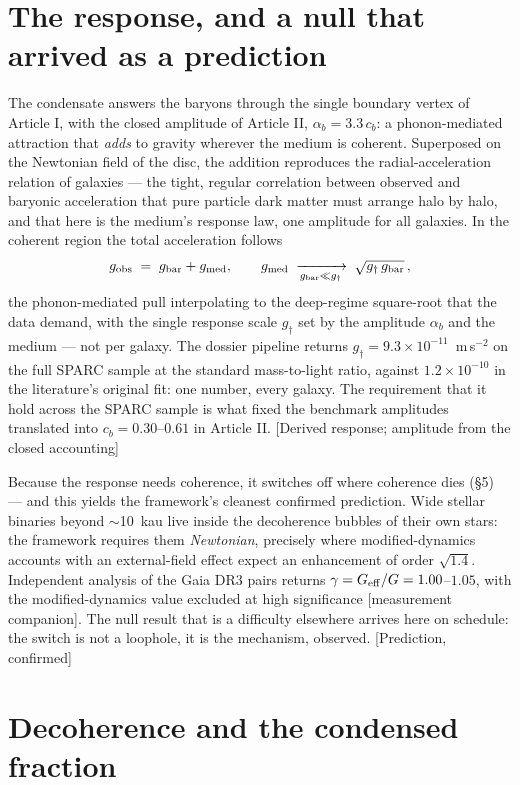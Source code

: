 \section{The response, and a null that arrived as a prediction}
The condensate answers the baryons through the single boundary vertex of Article I, with the closed amplitude of Article II, $\alpha_{b}=3.3\,c_{b}$: a phonon-mediated attraction that \emph{adds} to gravity wherever the medium is coherent. Superposed on the Newtonian field of the disc, the addition reproduces the radial-acceleration relation of galaxies --- the tight, regular correlation between observed and baryonic acceleration that pure particle dark matter must arrange halo by halo, and that here is the medium's response law, one amplitude for all galaxies. In the coherent region the total acceleration follows
\begin{equation}
g_{\rm obs}\;=\;g_{\rm bar}+g_{\rm med},\qquad g_{\rm med}\;\xrightarrow[g_{\rm bar}\ll g_{\dagger}]{}\;\sqrt{g_{\dagger}\,g_{\rm bar}}\,,
\end{equation}
the phonon-mediated pull interpolating to the deep-regime square-root that the data demand, with the single response scale $g_{\dagger}$ set by the amplitude $\alpha_{b}$ and the medium --- not per galaxy. The dossier pipeline returns $g_{\dagger}=9.3\times10^{-11}$~m\,s$^{-2}$ on the full SPARC sample at the standard mass-to-light ratio, against $1.2\times10^{-10}$ in the literature's original fit: one number, every galaxy. The requirement that it hold across the SPARC sample is what fixed the benchmark amplitudes translated into $c_{b}=0.30$--$0.61$ in Article II. [Derived response; amplitude from the closed accounting]

Because the response needs coherence, it switches off where coherence dies (\S5) --- and this yields the framework's cleanest confirmed prediction. Wide stellar binaries beyond $\sim$10~kau live inside the decoherence bubbles of their own stars: the framework requires them \emph{Newtonian}, precisely where modified-dynamics accounts with an external-field effect expect an enhancement of order $\sqrt{1.4}$. Independent analysis of the Gaia DR3 pairs returns $\gamma=G_{\rm eff}/G=1.00$--$1.05$, with the modified-dynamics value excluded at high significance [measurement companion]. The null result that is a difficulty elsewhere arrives here on schedule: the switch is not a loophole, it is the mechanism, observed. [Prediction, confirmed]

\section{Decoherence and the condensed fraction}
